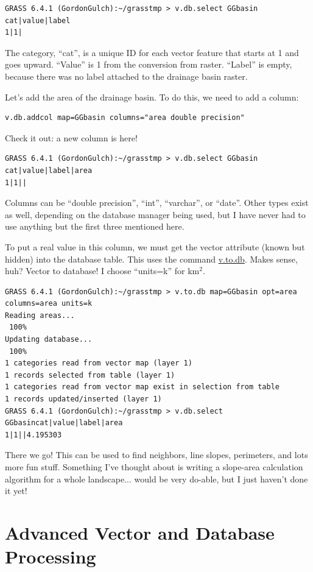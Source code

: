 \documentclass{book}
\begin{document}
\begin{lstlisting}
GRASS 6.4.1 (GordonGulch):~/grasstmp > v.db.select GGbasin
cat|value|label
1|1|
\end{lstlisting}

The category, ``cat'', is a unique ID for each vector feature that starts at 1 and goes upward. ``Value'' is 1 from the conversion from raster. ``Label'' is empty, because there was no label attached to the drainage basin raster.

Let's add the area of the drainage basin. To do this, we need to add a column:

\begin{lstlisting}
v.db.addcol map=GGbasin columns="area double precision"
\end{lstlisting}

Check it out: a new column is here!

\begin{lstlisting}
GRASS 6.4.1 (GordonGulch):~/grasstmp > v.db.select GGbasin
cat|value|label|area
1|1||
\end{lstlisting}

Columns can be ``double precision'', ``int'', ``varchar'', or ``date''. Other types exist as well, depending on the database manager being used, but I have never had to use anything but the first three mentioned here.

To put a real value in this column, we must get the vector attribute (known but hidden) into the database table. This uses the command \url{v.to.db}. Makes sense, huh? Vector to database! I choose ``units=k'' for km$^2$.

\begin{lstlisting}
GRASS 6.4.1 (GordonGulch):~/grasstmp > v.to.db map=GGbasin opt=area columns=area units=k
Reading areas...
 100%
Updating database...
 100%
1 categories read from vector map (layer 1)
1 records selected from table (layer 1)
1 categories read from vector map exist in selection from table
1 records updated/inserted (layer 1)
GRASS 6.4.1 (GordonGulch):~/grasstmp > v.db.select GGbasincat|value|label|area
1|1||4.195303
\end{lstlisting}

There we go! This can be used to find neighbors, line slopes, perimeters, and lots more fun stuff. Something I've thought about is writing a slope-area calculation algorithm for a whole landscape... would be very do-able, but I just haven't done it yet!

\section{Advanced Vector and Database Processing}
\end{document}

